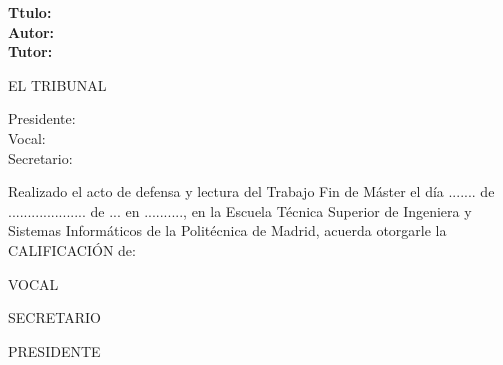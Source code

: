 \cleardoublepage

\begin{flushleft} \large
\textbf{Ttulo:} \TFM \\
\textbf{Autor:} \ME \\
\textbf{Tutor:} \TUTOR \\

\end{flushleft}

\hfill \break
\begin{center} \LARGE
EL TRIBUNAL \\ [1 cm]
\end{center}

\begin{flushleft} \LARGE
Presidente: \\ [1 cm]
Vocal: \\ [1 cm]
Secretario: \\ [1.5 cm]
\end{flushleft}

\large
Realizado el acto de defensa y lectura del Trabajo Fin de Máster el día
 ....... de ....................   de ... en .........., en la Escuela Técnica Superior
 de Ingeniera y Sistemas Informáticos de la Politécnica de Madrid, acuerda otorgarle la
 CALIFICACIÓN de: \\ [2 cm]

\begin{center}
 \large VOCAL \\ [2.2 cm]
\end{center}

\begin{minipage}{0.5\textwidth}
 \begin{flushleft}
 \large SECRETARIO
\end{flushleft}
\end{minipage}
\begin{minipage}{0.5\textwidth}
\begin{flushright}
 \large PRESIDENTE
\end{flushright}
\end{minipage}